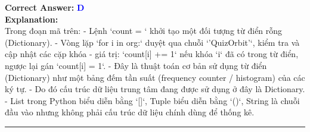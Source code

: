 \documentclass[11pt,a4paper]{article}
\begin{document}
\begin{minipage}{\textwidth}
\noindent \textbf{Correct Answer:} \textcolor{blue}{\textbf{D}} \\[4pt]
\noindent \textbf{Explanation:}\\
Trong đoạn mã trên:\newline
- Lệnh `count = {}` khởi tạo một đối tượng từ điển rỗng (Dictionary).\newline
- Vòng lặp `for i in org:` duyệt qua chuỗi `'QuizOrbit'`, kiểm tra và cập nhật các cặp khóa - giá trị: `count[i] += 1` nếu khóa `i` đã có trong từ điển, ngược lại gán `count[i] = 1`.\newline
- Đây là thuật toán cơ bản sử dụng từ điển (Dictionary) như một bảng đếm tần suất (frequency counter / histogram) của các ký tự.\newline
- Do đó cấu trúc dữ liệu trung tâm đang được sử dụng ở đây là Dictionary.\newline
- List trong Python biểu diễn bằng `[]`, Tuple biểu diễn bằng `()`, String là chuỗi đầu vào nhưng không phải cấu trúc dữ liệu chính dùng để thống kê.
\end{minipage}
\vspace{0.8cm}
\hrule
\vspace{0.5cm}
\end{document}

